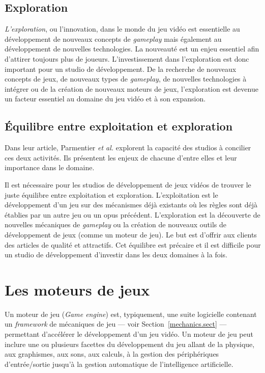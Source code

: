 \subsection{Exploration}
\emph{L'exploration}, ou l'innovation, dans le monde du jeu vidéo est essentielle au développement de nouveaux concepts de \emph{gameplay} mais également au développement de nouvelles technologies.
La nouveauté est un enjeu essentiel afin d'attirer toujours plus de joueurs.
L'investissement dans l'exploration est donc important pour un studio de développement.
De la recherche de nouveaux concepts de jeux, de nouveaux types de \emph{gameplay}, de nouvelles technologies à intégrer ou de la création de nouveaux moteurs de jeux, l'exploration est devenue un facteur essentiel au domaine du jeu vidéo et à son expansion.


\subsection{Équilibre entre exploitation et exploration}
Dans leur article, Parmentier \emph{et al.} \cite{ParmentierGuy2009Iecd} explorent la capacité des studios à concilier ces deux activités.
Ils présentent les enjeux de chacune d'entre elles et leur importance dans le domaine.

Il est nécessaire pour les studios de développement de jeux vidéos de trouver le juste équilibre entre exploitation et exploration.
L'exploitation est le développement d'un jeu sur des mécanismes déjà existants où les règles sont déjà établies par un autre jeu ou un opus précédent.
L'exploration est la découverte de nouvelles mécaniques de \emph{gameplay} ou la création de nouveaux outils de développement de jeux (comme un moteur de jeu).
Le but est d'offrir aux clients des articles de qualité et attractifs.
Cet équilibre est précaire et il est difficile pour un studio de développement d'investir dans les deux domaines à la fois. 



\section{Les moteurs de jeux}
Un moteur de jeu (\emph{Game engine}) est, typiquement, une suite logicielle contenant un \emph{framework} de mécaniques de jeu --- voir Section~\ref{mechanics.sect} --- permettant d'accélérer le développement d'un jeu vidéo.
Un moteur de jeu peut inclure une ou plusieurs facettes du développement du jeu allant de la physique, aux graphismes, aux sons, aux calculs, à la gestion des périphériques d'entrée/sortie jusqu'à la gestion automatique de l'intelligence artificielle.


